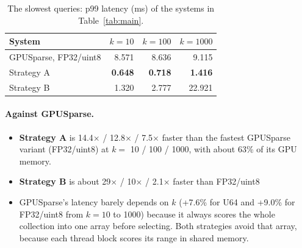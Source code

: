 \documentclass[11pt]{article}
\begin{document}
\begin{table}[H]
\centering
\caption{The slowest queries: p99 latency (ms) of the systems in Table~\ref{tab:main}.}
\label{tab:tail}
\begin{tabular}{lrrr}
\toprule
System & $k=10$ & $k=100$ & $k=1000$\\
\midrule
GPUSparse, FP32/uint8 & 8.571 & 8.636 & 9.115\\
Strategy A & \textbf{0.648} & \textbf{0.718} & \textbf{1.416}\\
Strategy B & 1.320 & 2.777 & 22.921\\
\bottomrule
\end{tabular}
\end{table}

\paragraph{Against GPUSparse.}
\begin{itemize}
\item \textbf{Strategy A} is 14.4$\times$ / 12.8$\times$ / 7.5$\times$ faster than the fastest GPUSparse variant
  (FP32/uint8) at $k=$ 10 / 100 / 1000, with about 63\% of its GPU memory.
\item \textbf{Strategy B} is about 29$\times$ / 10$\times$ / 2.1$\times$ faster than FP32/uint8
\item GPUSparse's latency barely depends on $k$ (+7.6\% for U64 and +9.0\% for FP32/uint8 from $k=10$ to 1000) because it
  always scores the whole collection into one array before selecting. Both strategies avoid that array,
  because each thread block scores its range in shared memory.
\end{itemize}
\end{document}
